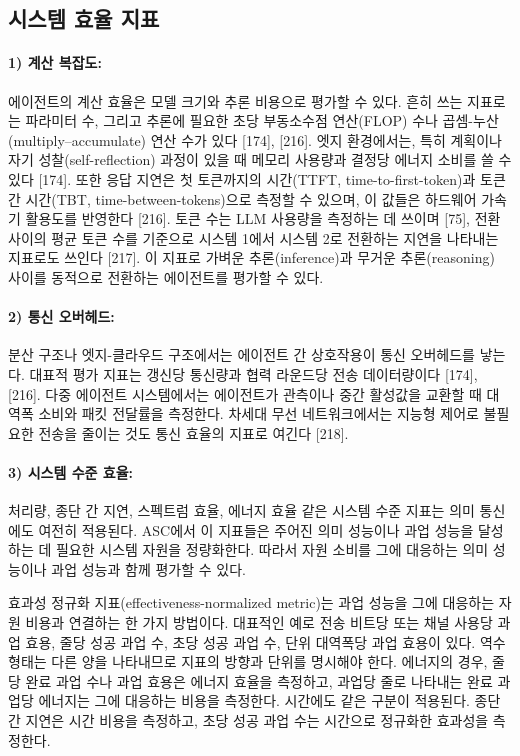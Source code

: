 \subsection{시스템 효율 지표}

\paragraph{1) 계산 복잡도:}
에이전트의 계산 효율은 모델 크기와 추론 비용으로 평가할 수 있다. 흔히 쓰는 지표로는 파라미터 수, 그리고 추론에 필요한 초당 부동소수점 연산(FLOP) 수나 곱셈-누산(multiply--accumulate) 연산 수가 있다 [174], [216]. 엣지 환경에서는, 특히 계획이나 자기 성찰(self-reflection) 과정이 있을 때 메모리 사용량과 결정당 에너지 소비를 쓸 수 있다 [174]. 또한 응답 지연은 첫 토큰까지의 시간(TTFT, time-to-first-token)과 토큰 간 시간(TBT, time-between-tokens)으로 측정할 수 있으며, 이 값들은 하드웨어 가속기 활용도를 반영한다 [216]. 토큰 수는 LLM 사용량을 측정하는 데 쓰이며 [75], 전환 사이의 평균 토큰 수를 기준으로 시스템 1에서 시스템 2로 전환하는 지연을 나타내는 지표로도 쓰인다 [217]. 이 지표로 가벼운 추론(inference)과 무거운 추론(reasoning) 사이를 동적으로 전환하는 에이전트를 평가할 수 있다.

\paragraph{2) 통신 오버헤드:}
분산 구조나 엣지-클라우드 구조에서는 에이전트 간 상호작용이 통신 오버헤드를 낳는다. 대표적 평가 지표는 갱신당 통신량과 협력 라운드당 전송 데이터량이다 [174], [216]. 다중 에이전트 시스템에서는 에이전트가 관측이나 중간 활성값을 교환할 때 대역폭 소비와 패킷 전달률을 측정한다. 차세대 무선 네트워크에서는 지능형 제어로 불필요한 전송을 줄이는 것도 통신 효율의 지표로 여긴다 [218].

\paragraph{3) 시스템 수준 효율:}
처리량, 종단 간 지연, 스펙트럼 효율, 에너지 효율 같은 시스템 수준 지표는 의미 통신에도 여전히 적용된다. ASC에서 이 지표들은 주어진 의미 성능이나 과업 성능을 달성하는 데 필요한 시스템 자원을 정량화한다. 따라서 자원 소비를 그에 대응하는 의미 성능이나 과업 성능과 함께 평가할 수 있다.

효과성 정규화 지표(effectiveness-normalized metric)는 과업 성능을 그에 대응하는 자원 비용과 연결하는 한 가지 방법이다. 대표적인 예로 전송 비트당 또는 채널 사용당 과업 효용, 줄당 성공 과업 수, 초당 성공 과업 수, 단위 대역폭당 과업 효용이 있다. 역수 형태는 다른 양을 나타내므로 지표의 방향과 단위를 명시해야 한다. 에너지의 경우, 줄당 완료 과업 수나 과업 효용은 에너지 효율을 측정하고, 과업당 줄로 나타내는 완료 과업당 에너지는 그에 대응하는 비용을 측정한다. 시간에도 같은 구분이 적용된다. 종단 간 지연은 시간 비용을 측정하고, 초당 성공 과업 수는 시간으로 정규화한 효과성을 측정한다.


